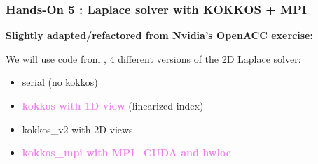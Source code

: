 \begin{frame}
  \frametitle{Hands-On 5 : Laplace solver with KOKKOS + MPI}

  \hypertarget{handson5}{}
  \textbf{Slightly adapted/refactored from Nvidia's OpenACC exercise:}\\

  We will use code from , 4 different versions of the 2D Laplace solver:
  \begin{itemize}
  \item serial (no kokkos)
  \item \textcolor{violet}{\bf kokkos with 1D view} (linearized index)
  \item kokkos\_v2 with 2D views
  \item \textcolor{violet}{\bf kokkos\_mpi with MPI+CUDA and hwloc}
  \end{itemize}
  
\end{frame}

